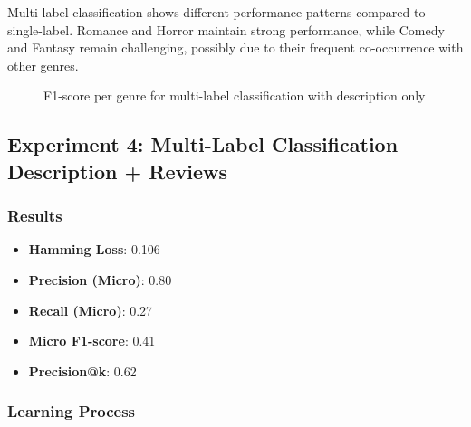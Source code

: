 \documentclass[12pt,a4paper]{article}
\begin{document}
Multi-label classification shows different performance patterns compared to single-label. Romance and Horror maintain strong performance, while Comedy and Fantasy remain challenging, possibly due to their frequent co-occurrence with other genres.

\begin{figure}[h]
\centering
{}
\caption{F1-score per genre for multi-label classification with description only}
\label{fig:exp3_per_class}
\end{figure}

\subsection{Experiment 4: Multi-Label Classification -- Description + Reviews}

\subsubsection{Results}

\begin{itemize}

    \item \textbf{Hamming Loss}: 0.106

    \item \textbf{Precision (Micro)}: 0.80

    \item \textbf{Recall (Micro)}: 0.27

    \item \textbf{Micro F1-score}: 0.41

    \item \textbf{Precision@k}: 0.62

\end{itemize}

\subsubsection{Learning Process}
\end{document}
